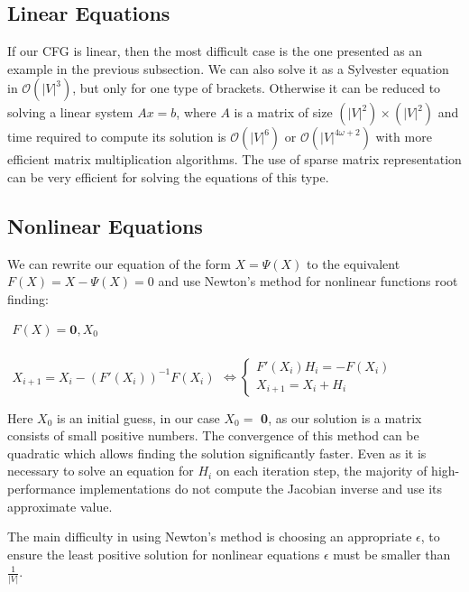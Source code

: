 \documentclass[sigconf]{acmart}
\begin{document}
\subsection{Linear Equations}

If our CFG is linear, then the most difficult case is the one presented as an example in the previous subsection. 
We can also solve it as a Sylvester equation in $\mathcal{O}(|V|^3)$, but only for one type of brackets.
Otherwise it can be reduced to solving a linear system $Ax = b$, where $A$ is a matrix of size $(|V|^2) \times (|V|^2)$ and time required to compute its solution is $\mathcal{O}(|V|^6)$ or $\mathcal{O}(|V|^{4\omega + 2})$ with more efficient matrix multiplication algorithms. 
The use of sparse matrix representation can be very efficient for solving the equations of this type.

\subsection{Nonlinear Equations}

We can rewrite our equation of the form $X = \Psi(X)$ to the equivalent $F(X) = X - \Psi(X) = 0$ and use Newton's method for nonlinear functions root finding:

\begin{center}
\(
\left.
\begin{array}{c}
F(X) = \mathbf{0}, X_0 \\
\end{array} 
\right.
\)

\(
\left. 
\begin{array}{l}
X_{i+1} = X_i - (F'(X_i))^{-1}F(X_i) 
\end{array} 
\right.
\iff 
\left\{
\begin{array}{l}
F'(X_i)H_i = - F(X_i) \\
X_{i+1} = X_i + H_i
\end{array} 
\right.
\)
\end{center}

Here $X_0$ is an initial guess, in our case $X_0 = $ \textbf{0}, as our solution is a matrix consists of small positive numbers. 
The convergence of this method can be quadratic which allows finding the solution significantly faster.
Even as it is necessary to solve an equation for $H_i$ on each iteration step, the majority of high-performance implementations do not compute the Jacobian inverse and use its approximate value.

The main difficulty in using Newton's method is choosing an appropriate $\epsilon$, to ensure the least positive solution for nonlinear equations $\epsilon$ must be smaller than $\frac{1}{|V|}$.
\end{document}
